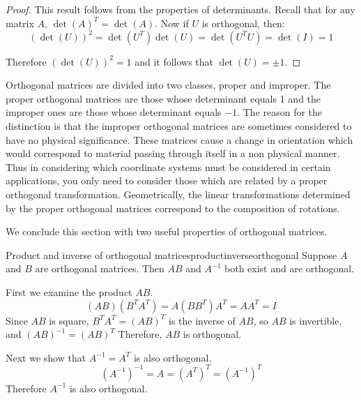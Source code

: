 \begin{proof}
This result follows from the properties of determinants. Recall that
for any matrix $A$, $\det(A)^T = \det(A)$. Now if $U$ is orthogonal, then:
\begin{equation*}
(\det \left( U\right)) ^{2}=\det \left( U^{T}\right) \det \left( U\right)
=\det \left( U^{T}U\right) =\det \left( I\right) =1
\end{equation*}

Therefore $(\det (U))^2 = 1$ and it follows that $\det \left( U\right) = \pm 1$. 
\end{proof}

Orthogonal matrices are divided into two classes, proper and improper.
The proper orthogonal matrices are those whose determinant equals 1
and the improper ones are those whose determinant equals $-1$. The
reason for the distinction is that the improper orthogonal matrices
are sometimes considered to have no physical significance. These
matrices cause a change in orientation which would correspond to
material passing through itself in a non physical manner. Thus in
considering which coordinate systems must be considered in certain
applications, you only need to consider those which are related by a
proper orthogonal transformation. Geometrically, the linear
transformations determined by the proper orthogonal matrices
correspond to the composition of rotations.

We conclude this section with two useful properties of orthogonal matrices. 

\begin{example}{Product and inverse of orthogonal matrices}{productinverseorthogonal}
Suppose $A$ and $B$ are orthogonal matrices. Then $AB$ and $A^{-1}$ both exist and are orthogonal.
\end{example}

\begin{solution}
First we examine the product $AB$. 
\[ (AB)(B^TA^T)=A(BB^T)A^T =AA^T=I \]
Since $AB$ is square, $B^TA^T=(AB)^T$ is the inverse of
$AB$, so $AB$ is invertible, and $(AB)^{-1}=(AB)^T$
Therefore, $AB$ is orthogonal.

Next we show that $A^{-1}=A^T$ is also orthogonal. 
\[ (A^{-1})^{-1} = A = (A^T)^{T}
=(A^{-1})^{T} \]
Therefore $A^{-1}$ is also orthogonal.
\end{solution}